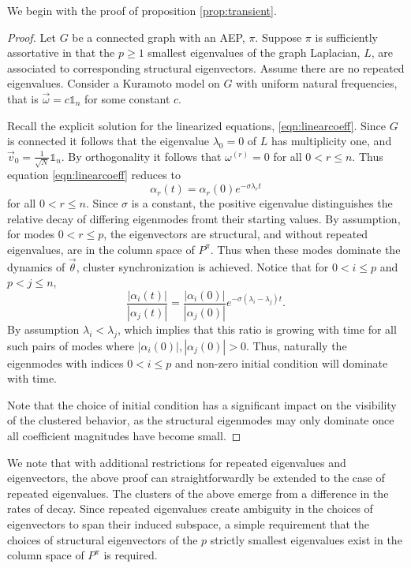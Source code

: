 \documentclass[%
 aip,
 amsmath,amssymb,
preprint,
reprint, onecolumn %
]{revtex4-1}
\begin{document}
We begin with the proof of proposition \ref{prop:transient}.

\begin{proof}
    Let $G$ be a connected graph with an AEP, $\pi$. Suppose $\pi$ is sufficiently assortative in that the $p\geq 1$ smallest eigenvalues of the graph Laplacian, $L$, are associated to corresponding structural eigenvectors. Assume there are no repeated eigenvalues. Consider a Kuramoto model on $G$ with uniform natural frequencies, that is $\vec{\omega} = c\mathbb{1}_n$ for some constant $c$.

    Recall the explicit solution for the linearized equations, \ref{eqn:linearcoeff}. Since $G$ is connected it follows that the eigenvalue $\lambda_0=0$ of $L$ has multiplicity one, and $\vec{v}_0=\frac{1}{\sqrt{N}}\mathbb{1}_n$. By orthogonality it follows that $\omega^{(r)}=0$ for all $0< r\leq n$. Thus equation \ref{eqn:linearcoeff} reduces to
    \[
        \alpha_r(t) = \alpha_r(0) e^{-\sigma \lambda_r t}
    \]
    for all $0< r\leq n$. Since $\sigma$ is a constant, the positive eigenvalue distinguishes the relative decay of differing eigenmodes fromt their starting values. By assumption, for modes $0<r\leq p$, the eigenvectors are structural, and without repeated eigenvalues, are in the column space of $P^\pi$. Thus when these modes dominate the dynamics of $\vec{\theta}$, cluster synchronization is achieved. Notice that for $0<i\leq p$ and $p<j\leq n$,
    \[
    \frac{|\alpha_i(t)|}{|\alpha_j(t)|} = \frac{|\alpha_i(0)|}{|\alpha_j(0)|} e^{-\sigma (\lambda_i-\lambda_j)t}.
    \]
    By assumption $\lambda_i<\lambda_j$, which implies that this ratio is growing with time for all such pairs of modes where $|\alpha_i(0)|,|\alpha_j(0)|>0$. Thus, naturally the eigenmodes with indices $0< i\leq p$ and non-zero initial condition will dominate with time. 
    
    Note that the choice of initial condition has a significant impact on the visibility of the clustered behavior, as the structural eigenmodes may only dominate once all coefficient magnitudes have become small.
\end{proof}

We note that with additional restrictions for repeated eigenvalues and eigenvectors, the above proof can straightforwardly be extended to the case of repeated eigenvalues. The clusters of the above emerge from a difference in the rates of decay. Since repeated eigenvalues create ambiguity in the choices of eigenvectors to span their induced subspace, a simple requirement that the choices of structural eigenvectors of the $p$ strictly smallest eigenvalues exist in the column space of $P^\pi$ is required.
\end{document}
